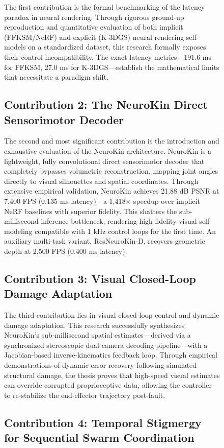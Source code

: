 \documentclass[12pt,a4paper,oneside]{report}
\begin{document}
\begin{figure}[H]
The first contribution is the formal benchmarking of the latency paradox in neural rendering. Through rigorous ground-up reproduction and quantitative evaluation of both implicit (FFKSM/NeRF) and explicit (K-3DGS) neural rendering self-models on a standardized dataset, this research formally exposes their control incompatibility. The exact latency metrics---191.6 ms for FFKSM, 27.0 ms for K-3DGS---establish the mathematical limits that necessitate a paradigm shift.

\subsection{Contribution 2: The NeuroKin Direct Sensorimotor Decoder}
\label{subsec:contrib_neurokin_intro}

The second and most significant contribution is the introduction and exhaustive evaluation of the NeuroKin architecture. NeuroKin is a lightweight, fully convolutional direct sensorimotor decoder that completely bypasses volumetric reconstruction, mapping joint angles directly to visual silhouettes and spatial coordinates. Through extensive empirical validation, NeuroKin achieves 21.88 dB PSNR at 7,400 FPS (0.135 ms latency)---a 1,418$\times$ speedup over implicit NeRF baselines with superior fidelity. This shatters the sub-millisecond inference bottleneck, rendering high-fidelity visual self-modeling compatible with 1 kHz control loops for the first time. An auxiliary multi-task variant, ResNeuroKin-D, recovers geometric depth at 2,500 FPS (0.400 ms latency).

\subsection{Contribution 3: Visual Closed-Loop Damage Adaptation}
\label{subsec:contrib_closed_loop_intro}

The third contribution lies in visual closed-loop control and dynamic damage adaptation. This research successfully synthesizes NeuroKin's sub-millisecond spatial estimates---derived via a synchronized stereoscopic dual-camera decoding pipeline---with a Jacobian-based inverse-kinematics feedback loop. Through empirical demonstrations of dynamic error recovery following simulated structural damage, the thesis proves that high-speed visual estimates can override corrupted proprioceptive data, allowing the controller to re-stabilize the end-effector trajectory post-fault.

\subsection{Contribution 4: Temporal Stigmergy for Sequential Swarm Coordination}
\label{subsec:contrib_stigmergy_intro}


\end{figure}
\end{document}
